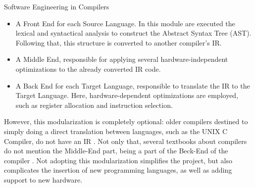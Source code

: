 \begin{section}{Software Engineering in Compilers}
%

\begin{itemize}

\item A Front End for each Source Language. In this module are executed the
lexical and syntactical analysis to construct the Abstract Syntax Tree (AST).
Following that, this structure is converted to another compiler's IR.

\item A Middle End, responsible for applying several hardware-independent
optimizations to the already converted IR code.

\item A Back End for each Target Language, responsible to translate the IR to
the Target Language. Here, hardware-dependent optimizations are employed, such
as register allocation and instruction selection.

\end{itemize}

%
%

However, this modularization is completely optional: older compilers destined
to simply doing a direct translation between languages, such as the UNIX C
Compiler, do not have an IR \citep{ritchie1979tour}. Not only that, several
textbooks about compilers do not mention the Middle-End part, being a part of
the Beck-End of the compiler \citep{dragonbook}. Not adopting this
modularization simplifies the project, but also complicates the insertion of
new programming languages, as well as adding support to new hardware.


\end{section}
